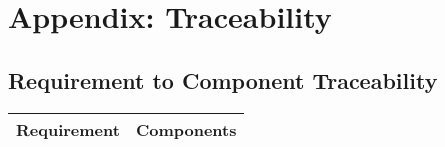 
\newpage
\section{Appendix: Traceability}\label{appendix-traceability}

\subsection{Requirement to Component
Traceability}\label{requirement-to-component-traceability}

\footnotesize
\begin{longtable}{p{}p{}}
\hline
\multicolumn{1}{c}{\textbf{Requirement}} &
\multicolumn{1}{c}{\textbf{Components}} \\ \hline
\endhead


\end{longtable}
